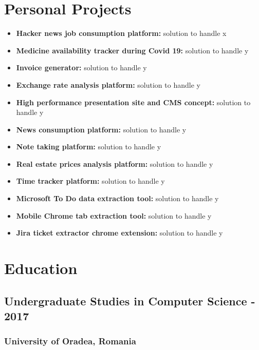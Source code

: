 \documentclass[11pt]{article}
\begin{document}
    \section{Personal Projects}
    \begin{itemize}
        \item \textbf{Hacker news job consumption platform:} solution to handle x
        \item \textbf{Medicine availability tracker during Covid 19:} solution to handle y
        \item \textbf{Invoice generator:} solution to handle y
        \item \textbf{Exchange rate analysis platform:} solution to handle y
        \item \textbf{High performance presentation site and CMS concept:} solution to handle y
        \item \textbf{News consumption platform:} solution to handle y
        \item \textbf{Note taking platform:} solution to handle y
        \item \textbf{Real estate prices analysis platform:} solution to handle y
        \item \textbf{Time tracker platform:} solution to handle y
        \item \textbf{Microsoft To Do data extraction tool:} solution to handle y
        \item \textbf{Mobile Chrome tab extraction tool:} solution to handle y
        \item \textbf{Jira ticket extractor chrome extension:} solution to handle y
    \end{itemize}

    \section{Education}
    \subsection{Undergraduate Studies in Computer Science\hfill {} - 2017}  
    \subsubsection{University of Oradea,  Romania}
        
    
\end{document}
